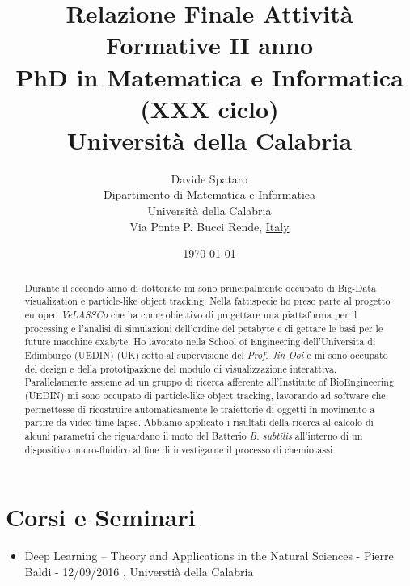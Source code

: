 \documentclass[a4paper,11pt]{paper}
\begin{document}
\title{Relazione Finale Attività Formative II anno \\ PhD in Matematica e
Informatica (XXX ciclo)\\ Università della Calabria}
\author{
       Davide Spataro \\
                Dipartimento di Matematica e Informatica\\
        Università della Calabria\\
Via Ponte P. Bucci Rende, \underline{Italy}
}
\date{\today}


\maketitle


\begin{abstract}
Durante il secondo anno di dottorato mi sono principalmente occupato di Big-Data visualization e particle-like object tracking.
Nella fattispecie ho preso parte al progetto  europeo \textit{VeLASSCo} che ha come obiettivo di progettare una piattaforma per il processing e l'analisi di simulazioni dell'ordine del petabyte e di gettare le basi per le future macchine exabyte. Ho lavorato nella School of Engineering dell'Università di Edimburgo (UEDIN) (UK) sotto al supervisione del \textit{Prof. Jin Ooi} e mi sono occupato del design e della prototipazione del modulo di visualizzazione interattiva. 
Parallelamente assieme ad un gruppo di ricerca afferente all'Institute of BioEngineering (UEDIN) mi sono occupato di particle-like object tracking, lavorando ad software che permettesse di ricostruire automaticamente le traiettorie di oggetti in movimento a partire da video time-lapse. Abbiamo applicato i risultati della ricerca al calcolo di alcuni parametri che riguardano il moto del Batterio \textit{B. subtilis} all'interno di un dispositivo micro-fluidico al fine di investigarne il processo di chemiotassi.
\end{abstract}


\section{Corsi e Seminari}
\begin{itemize}
	\item Deep Learning – Theory and Applications in the Natural Sciences - Pierre Baldi - 12/09/2016 , Universtià della Calabria
\end{itemize}
\end{document}
